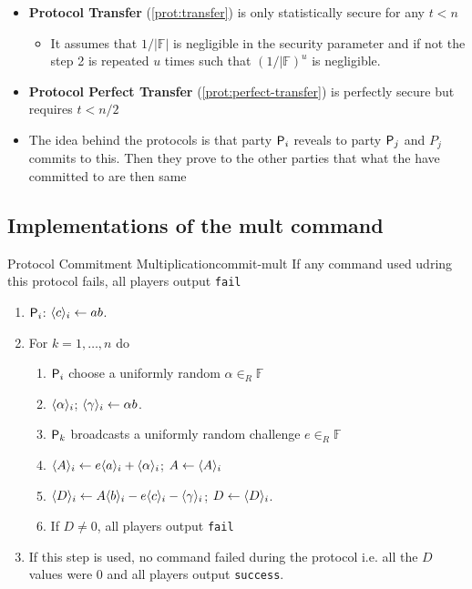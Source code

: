 \begin{itemize}
  \item \textbf{Protocol Transfer} (\autoref{prot:transfer}) is only statistically secure for any $t < n$
  \begin{itemize}
  	\item It assumes that $1/|\mathbb{F}|$ is negligible in the security parameter and if not the step 2 is repeated $u$ times such that $(1/|\mathbb{F})^u$ is negligible.
  \end{itemize}
  \item \textbf{Protocol Perfect Transfer} (\autoref{prot:perfect-transfer}) is perfectly secure but requires $t < n/2$
  \item The idea behind the protocols is that party $\P_i$ reveals to party $\P_j$ and $P_j$ commits to this. Then they prove to the other parties that what the have committed to are then same

\end{itemize}

\subsection{Implementations of the mult command}
\begin{protocol}{Protocol Commitment Multiplication}{commit-mult}
  If any command used udring this protocol fails, all players output \texttt{fail}
  \begin{enumerate}
  	\item $\P_i$: $\commit{c}{i} \leftarrow ab$.
    \item For $k=1,\dots,n$ do
    \begin{enumerate}
    	\item $\P_i$ choose a uniformly random $\alpha \in_R \mathbb F$
      \item $\commit{\alpha}{i}$; $\commit{\gamma}{i} \leftarrow \alpha b$.
      \item $\P_k$ broadcasts a uniformly random challenge $e \in_R \mathbb F$
      \item $\commit{A}{i} \leftarrow e \commit{a}{i} + \commit{\alpha}{i}$; $A \leftarrow \commit{A}{i}$
      \item $\commit{D}{i} \leftarrow A \commit{b}{i} - e \commit{c}{i} - \commit{\gamma}{i}$; $D \leftarrow \commit{D}{i}$.
      \item If $D \neq 0$, all players output \texttt{fail}
    \end{enumerate}
  \item If this step is used, no command failed during the protocol i.e. all the $D$ values were $0$ and all players output \texttt{success}.
  \end{enumerate}
\end{protocol}

